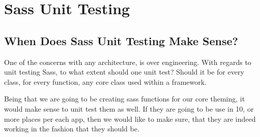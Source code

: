 \maketitle{}
\section{ Sass Unit Testing }

\subsection{ When Does Sass Unit Testing Make Sense? }
One of the concerns with any architecture, is over engineering. With regards to
unit testing Sass, to what extent should one unit test? Should it be for every
class, for every function, any core class used within a framework.

Being that we are going to be creating sass functions for our core theming, it
would make sense to unit test them as well. If they are going to be use in 10,
or more places per each app, then we would like to make sure, that they are
indeed working in the fashion that they should be.
